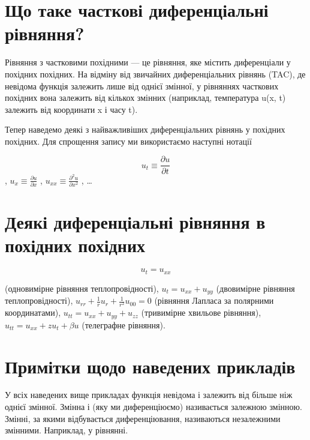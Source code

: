 \documentclass[
  ukrainian,
]{article}
\begin{document}
\section{Що таке часткові диференціальні
рівняння?}\label{ux449ux43e-ux442ux430ux43aux435-ux447ux430ux441ux442ux43aux43eux432ux456-ux434ux438ux444ux435ux440ux435ux43dux446ux456ux430ux43bux44cux43dux456-ux440ux456ux432ux43dux44fux43dux43dux44f}

Рівняння з частковими похідними --- це рівняння, яке містить
диференціали у похідних похідних. На відміну від звичайних
диференціальних рівнянь (TAC), де невідома функція залежить лише від
однієї змінної, у рівняннях часткових похідних вона залежить від кількох
змінних (наприклад, температура u(x, t) залежить від координати x і часу
t).

Тепер наведемо деякі з найважливіших диференціальних рівнянь у похідних
похідних. Для спрощення запису ми використаємо наступні нотації

\[u_t \equiv \frac{\partial u}{\partial t}\],
\(u_x \equiv \frac{\partial u}{\partial x}\) ,
\(u_{xx} \equiv \frac{\partial^2 u}{\partial x^2}\) , \ldots{}

\section{Деякі диференціальні рівняння в похідних
похідних}\label{ux434ux435ux44fux43aux456-ux434ux438ux444ux435ux440ux435ux43dux446ux456ux430ux43bux44cux43dux456-ux440ux456ux432ux43dux44fux43dux43dux44f-ux432-ux43fux43eux445ux456ux434ux43dux438ux445-ux43fux43eux445ux456ux434ux43dux438ux445}

\[u_t = u_{xx}\]

(одновимірне рівняння теплопровідності), \(u_t = u_{xx} + u_{yy}\)
(двовимірне рівняння теплопровідності),
\(u_{rr} + \frac{1}{r}u_r + \frac{1}{r^2}u_{00} = 0\) (рівняння Лапласа
за полярними координатами), \(u_{tt} = u_{xx} + u_{yy} + u_{zz}\)
(тривимірне хвильове рівняння), \(u_{tt} = u_{xx} + zu_t + \beta u\)
(телеграфне рівняння).

\section{Примітки щодо наведених
прикладів}\label{ux43fux440ux438ux43cux456ux442ux43aux438-ux449ux43eux434ux43e-ux43dux430ux432ux435ux434ux435ux43dux438ux445-ux43fux440ux438ux43aux43bux430ux434ux456ux432}

У всіх наведених вище прикладах функція невідома і залежить від більше
ніж однієї змінної. Змінна і (яку ми диференціюємо) називається залежною
змінною. Змінні, за якими відбувається диференціювання, називаються
незалежними змінними. Наприклад, у рівнянні.
\end{document}
